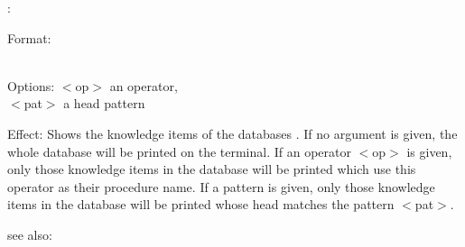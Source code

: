 :

Format: \\
        \\

Options: $<$op$>$ an operator,\\
         $<$pat$>$ a head pattern

Effect: Shows the knowledge items of the databases . If no
	argument is given, the whole database will be printed on the terminal. 
	If an operator $<$op$>$ is given, only those knowledge items in the 
	database will be printed which use this operator as their procedure 
	name. If a pattern is given, only those knowledge items in the database
	will be printed whose head matches the pattern $<$pat$>$.

see also: 
